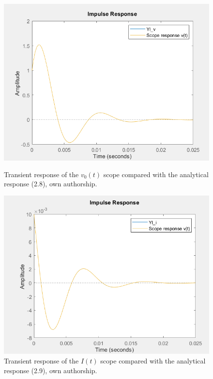 \documentclass[a4paper,12pt]{article}
\begin{document}
\begin{figure}[H]
    \centering
    \begin{minipage}[b]{0.4\linewidth}
        \centering
        \includegraphics[width=\linewidth]{fonts_lab_2/scope_analytical_v.png}
        \caption{Transient response of the $v_0(t)$ scope compared with the analytical response (2.8), own authorship.}
        \label{fig:scopeanalyticalv}
    \end{minipage}
    \hspace{0.05\linewidth} %
    \begin{minipage}[b]{0.4\linewidth}
        \centering
        \includegraphics[width=\linewidth]{fonts_lab_2/scope_analytical_i.png}
        \caption{Transient response of the $I(t)$ scope compared with the analytical response (2.9), own authorship.}
        \label{fig:scopeanalyticali}
    \end{minipage}
\end{figure}
\end{document}
